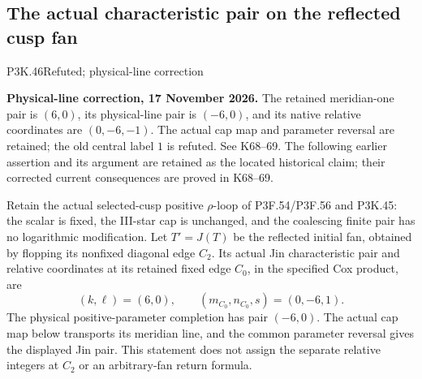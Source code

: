 \subsection{The actual characteristic pair on the reflected cusp fan}
\begin{statement}{P3K.46}{Refuted; physical-line correction}\par\noindent\textbf{Physical-line correction, 17 November 2026.} The retained meridian-one pair is \((6,0)\), its physical-line pair is \((-6,0)\), and its native relative coordinates are \((0,-6,-1)\). The actual cap map and parameter reversal are retained; the old central label \(1\) is refuted. See K68--69. The following earlier assertion and its argument are retained as the located historical claim; their corrected current consequences are proved in K68--69.\medskip\par 
Retain the actual selected-cusp positive \(\rho\)-loop of
P3F.54/P3F.56 and P3K.45: the scalar is fixed, the III-star cap
is unchanged, and the coalescing finite pair has no logarithmic
modification. Let \(T'=J(T)\) be the reflected initial fan, obtained
by flopping its nonfixed diagonal edge \(C_2\). Its actual Jin
characteristic pair and relative coordinates at its retained fixed
edge \(C_0\), in the specified Cox product, are
\[
 (k,\ell)=(6,0),\qquad
 (m_{C_0},n_{C_0},s)=(0,-6,1).
\]
The physical positive-parameter completion has pair \((-6,0)\).
The actual cap map below transports its meridian line, and the common
parameter reversal gives the displayed Jin pair. This statement
does not assign the separate relative integers at \(C_2\) or an
arbitrary-fan return formula.
\end{statement}
